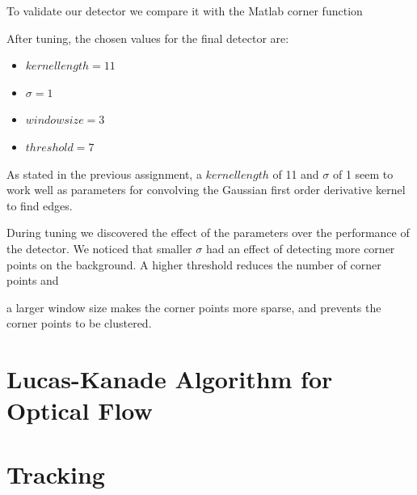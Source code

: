 \documentclass[11pt]{article}
\begin{document}
To validate our detector we compare it with the Matlab corner function




After tuning, the chosen values for the final detector are: 
\begin{itemize}
	\item $kernel  length = 11$
	\item $\sigma = 1$
	\item $window  size = 3$
	\item $threshold = 7$ 
\end{itemize}

As stated in the previous assignment, a $kernel length$ of 11 and $\sigma$ of 1 seem to work well as parameters for convolving the Gaussian first order derivative kernel to find edges. 

During tuning we discovered the effect of the parameters over the performance of the detector. We noticed that smaller $\sigma$ had an effect of detecting more corner points on the background. A higher threshold reduces the number of corner points and 

a larger window size makes the corner points more sparse, and prevents the corner points to be clustered. 

\section{Lucas-Kanade Algorithm for Optical Flow}



\section{Tracking}
\end{document}
